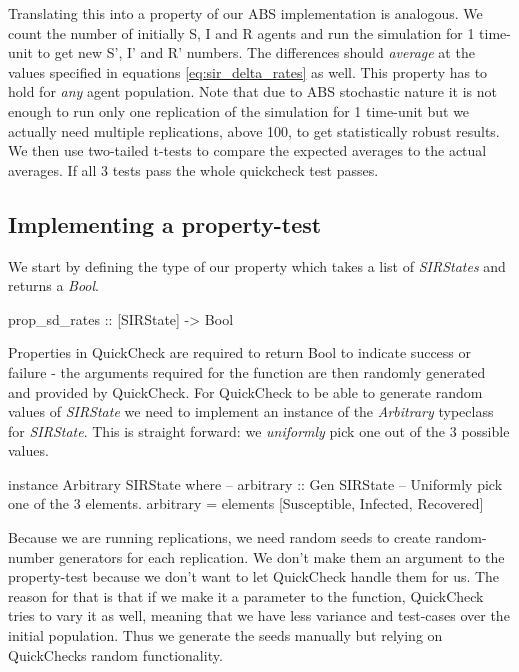 Translating this into a property of our ABS implementation is analogous. We count the number of initially S, I and R agents and run the simulation for 1 time-unit to get new S', I' and R' numbers. The differences should \textit{average} at the values specified in equations \ref{eq:sir_delta_rates} as well. This property has to hold for \textit{any} agent population. Note that due to ABS stochastic nature it is not enough to run only one replication of the simulation for 1 time-unit but we actually need multiple replications, above 100, to get statistically robust results. We then use two-tailed t-tests to compare the expected averages to the actual averages. If all 3 tests pass the whole quickcheck test passes.

\subsection{Implementing a property-test}
We start by defining the type of our property which takes a list of \textit{SIRStates} and returns a \textit{Bool}.

\begin{HaskellCode}
prop_sd_rates :: [SIRState] -> Bool
\end{HaskellCode}

Properties in QuickCheck are required to return Bool to indicate success or failure - the arguments required for the function are then randomly generated and provided by QuickCheck. For QuickCheck to be able to generate random values of \textit{SIRState} we need to implement an instance of the \textit{Arbitrary} typeclass for \textit{SIRState}. This is straight forward: we \textit{uniformly} pick one out of the 3 possible values.

\begin{HaskellCode}
instance Arbitrary SIRState where
  -- arbitrary :: Gen SIRState
  -- Uniformly pick one of the 3 elements.
  arbitrary = elements [Susceptible, Infected, Recovered]
\end{HaskellCode}

Because we are running replications, we need random seeds to create random-number generators for each replication. We don't make them an argument to the property-test because we don't want to let QuickCheck handle them for us. The reason for that is that if we make it a parameter to the function, QuickCheck tries to vary it as well, meaning that we have less variance and test-cases over the initial population. Thus we generate the seeds manually but relying on QuickChecks random functionality.


